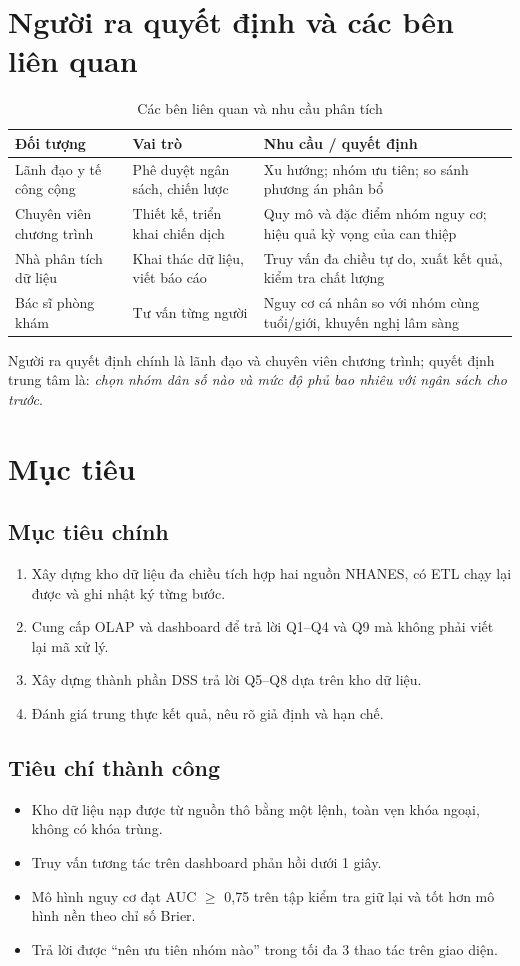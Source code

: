 \section{Người ra quyết định và các bên liên quan}
\begin{table}[H]
\renewcommand{\arraystretch}{1.35}\setlength{\extrarowheight}{3pt}
\centering
\caption{Các bên liên quan và nhu cầu phân tích}
\small
\begin{tabularx}{\textwidth}{|p{3.3cm}|p{3.7cm}|X|}
\hline
\textbf{Đối tượng} & \textbf{Vai trò} & \textbf{Nhu cầu / quyết định} \\ \hline
Lãnh đạo y tế công cộng & Phê duyệt ngân sách, chiến lược & Xu hướng; nhóm ưu tiên; so sánh phương án phân bổ \\ \hline
Chuyên viên chương trình & Thiết kế, triển khai chiến dịch & Quy mô và đặc điểm nhóm nguy cơ; hiệu quả kỳ vọng của can thiệp \\ \hline
Nhà phân tích dữ liệu & Khai thác dữ liệu, viết báo cáo & Truy vấn đa chiều tự do, xuất kết quả, kiểm tra chất lượng \\ \hline
Bác sĩ phòng khám & Tư vấn từng người & Nguy cơ cá nhân so với nhóm cùng tuổi/giới, khuyến nghị lâm sàng \\ \hline
\end{tabularx}
\end{table}
Người ra quyết định chính là lãnh đạo và chuyên viên chương trình; quyết định trung tâm là: \emph{chọn nhóm dân số nào và mức độ phủ bao nhiêu với ngân sách cho trước}.

\section{Mục tiêu}
\subsection{Mục tiêu chính}
\begin{enumerate}
\item Xây dựng kho dữ liệu đa chiều tích hợp hai nguồn NHANES, có ETL chạy lại được và ghi nhật ký từng bước.
\item Cung cấp OLAP và dashboard để trả lời Q1--Q4 và Q9 mà không phải viết lại mã xử lý.
\item Xây dựng thành phần DSS trả lời Q5--Q8 dựa trên kho dữ liệu.
\item Đánh giá trung thực kết quả, nêu rõ giả định và hạn chế.
\end{enumerate}
\subsection{Tiêu chí thành công}
\begin{itemize}
\item Kho dữ liệu nạp được từ nguồn thô bằng một lệnh, toàn vẹn khóa ngoại, không có khóa trùng.
\item Truy vấn tương tác trên dashboard phản hồi dưới 1 giây.
\item Mô hình nguy cơ đạt AUC $\geq$ 0,75 trên tập kiểm tra giữ lại và tốt hơn mô hình nền theo chỉ số Brier.
\item Trả lời được ``nên ưu tiên nhóm nào'' trong tối đa 3 thao tác trên giao diện.
\end{itemize}

